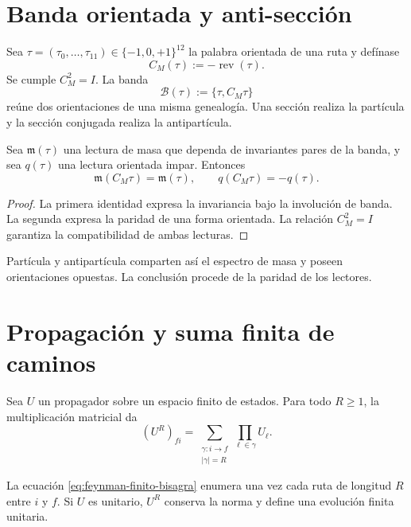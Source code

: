 \section{Banda orientada y anti-sección}

Sea \(\tau=(\tau_0,\ldots,\tau_{11})\in\{-1,0,+1\}^{12}\) la palabra
orientada de una ruta y defínase
\begin{equation}
 C_M(\tau):=-\operatorname{rev}(\tau).
 \label{eq:conjugacion-material-bisagra}
\end{equation}
Se cumple \(C_M^2=I\). La banda
\[
 \mathcal B(\tau):=\{\tau,C_M\tau\}
\]
reúne dos orientaciones de una misma genealogía. Una sección realiza la
partícula y la sección conjugada realiza la antipartícula.

\begin{proposition}
\label{prop:paridad-masa-orientacion-bisagra}
Sea \(\mathfrak m(\tau)\) una lectura de masa que dependa de invariantes pares
de la banda, y sea \(q(\tau)\) una lectura orientada impar. Entonces
\[
 \mathfrak m(C_M\tau)=\mathfrak m(\tau),
 \qquad
 q(C_M\tau)=-q(\tau).
\]
\end{proposition}

\begin{proof}
La primera identidad expresa la invariancia bajo la involución de banda. La
segunda expresa la paridad de una forma orientada. La relación \(C_M^2=I\)
garantiza la compatibilidad de ambas lecturas.
\end{proof}

Partícula y antipartícula comparten así el espectro de masa y poseen
orientaciones opuestas. La conclusión procede de la paridad de los lectores.

\section{Propagación y suma finita de caminos}

Sea \(U\) un propagador sobre un espacio finito de estados. Para todo
\(R\geq1\), la multiplicación matricial da
\begin{equation}
 (U^R)_{fi}
 =\sum_{\substack{\gamma:i\to f\\|\gamma|=R}}
   \prod_{\ell\in\gamma}U_\ell.
 \label{eq:feynman-finito-bisagra}
\end{equation}

\begin{theorem}
\label{thm:feynman-finito-bisagra}
La ecuación \eqref{eq:feynman-finito-bisagra} enumera una vez cada ruta de
longitud \(R\) entre \(i\) y \(f\). Si \(U\) es unitario, \(U^R\) conserva
la norma y define una evolución finita unitaria.
\end{theorem}

